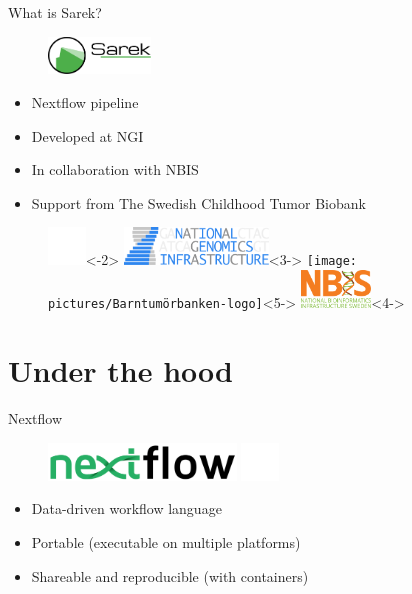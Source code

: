 \documentclass[usepdftitle=false]{beamer}
\begin{document}
\begin{frame}{What is Sarek?}
	\begin{figure}
		\includegraphics[height=1cm]{pictures/Sarek_no_border}
	\end{figure}
	\begin{itemize}
		\pause
		\item Nextflow pipeline
		\item<3-> Developed at NGI
		\item<4-> In collaboration with NBIS
		\item<5-> Support from The Swedish Childhood Tumor Biobank
	\end{itemize}
	\begin{figure}
		\includegraphics[height=1cm]{pictures/blank}<-2>
		\includegraphics[height=1cm]{pictures/NGI}<3->
		\only<3->{\hfill}
		\texttt{[image: pictures/Barntumörbanken-logo]}<5->
		\only<4->{\hfill}
		\includegraphics[height=1cm]{pictures/NBIS}<4->
	\end{figure}
	\vfill
\end{frame}

\section{Under the hood}

\begin{frame}{Nextflow}
	\begin{figure}
		\includegraphics[height=1cm]{pictures/nextflow.png}
		\includegraphics[height=1cm]{pictures/blank}
	\end{figure}
	\begin{itemize}
		\item Data-driven workflow language
		\pause
		\item Portable (executable on multiple platforms)
		\pause
		\item Shareable and reproducible (with containers)
	\end{itemize}
	\vfill
\end{frame}
\end{document}
